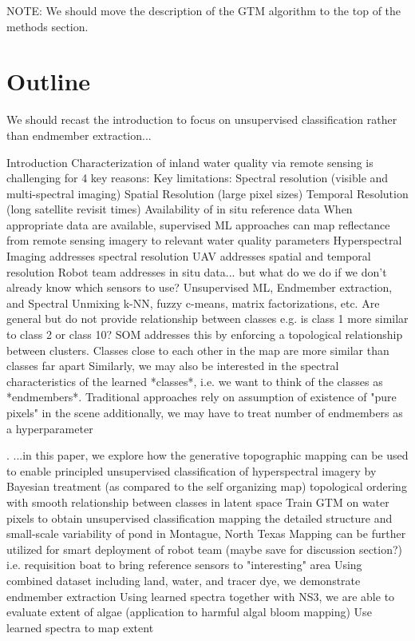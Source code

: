 \documentclass{article}
\begin{document}
NOTE: We should move the description of the GTM algorithm to the top of the methods section.

\section*{Outline}
We should recast the introduction to focus on unsupervised classification rather than endmember extraction... 



\begin{outline}[enumerate]
\1 Introduction
    \2 Characterization of inland water quality via remote sensing is challenging for 4 key reasons:
        \3 Key limitations:
            \4 Spectral resolution (visible and multi-spectral imaging)
            \4 Spatial Resolution (large pixel sizes)
            \4 Temporal Resolution (long satellite revisit times)
            \4 Availability of in situ reference data
        \3 When appropriate data are available, supervised ML approaches can map reflectance from remote sensing imagery to relevant water quality parameters
    \2 Hyperspectral Imaging addresses spectral resolution
    \2 UAV addresses spatial and temporal resolution
    \2 Robot team addresses in situ data... but what do we do if we don't already know which sensors to use? 
    \2 Unsupervised ML, Endmember extraction, and Spectral Unmixing
        \3 k-NN, fuzzy c-means, matrix factorizations, etc.
            \4 Are general but do not provide relationship between classes e.g. is class 1 more similar to class 2 or class 10?
        \3 SOM addresses this by enforcing a topological relationship between clusters. Classes close to each other in the map are more similar than classes far apart
        \3 Similarly, we may also be interested in the spectral characteristics of the learned *classes*, i.e. we want to think of the classes as *endmembers*.
            \4 Traditional approaches rely on assumption of existence of "pure pixels" in the scene
            \4 additionally, we may have to treat number of endmembers as a hyperparameter

    \2. ...in this paper, we explore how the generative topographic mapping can be used to
        \3 enable principled unsupervised classification of hyperspectral imagery by
            \4 Bayesian treatment (as compared to the self organizing map)
            \4 topological ordering with smooth relationship between classes in latent space
        \3 Train GTM on water pixels to obtain unsupervised classification mapping the detailed structure and small-scale variability of pond in Montague, North Texas
        \3 Mapping can be further utilized for smart deployment of robot team (maybe save for discussion section?) i.e. requisition boat to bring reference sensors to "interesting" area
        \3 Using combined dataset including land, water, and tracer dye, we demonstrate endmember extraction
        \3 Using learned spectra together with NS3, we are able to evaluate extent of algae (application to harmful algal bloom mapping)
        \3 Use learned spectra to map extent



\end{outline}
\end{document}

